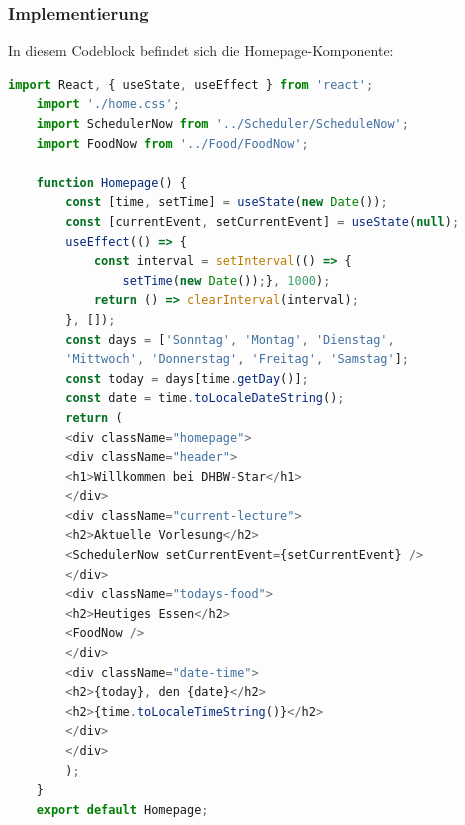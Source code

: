 \subsubsection{Implementierung}
In diesem Codeblock befindet sich die Homepage-Komponente:\\
\begin{lstlisting}[language=JavaScript,
	frame=single,           % Ein Rahmen um den Code
	framexleftmargin=15pt,  % Rahmen link von den Zahlen
	style=algoBericht,
	label={Homepage-Komponente},
	captionpos=b ,          % Caption unter den Code setzen
	caption={Homepage-Komponente}]
	import React, { useState, useEffect } from 'react';
	import './home.css';
	import SchedulerNow from '../Scheduler/ScheduleNow';
	import FoodNow from '../Food/FoodNow';
	
	function Homepage() {
		const [time, setTime] = useState(new Date());
		const [currentEvent, setCurrentEvent] = useState(null);
		useEffect(() => {
			const interval = setInterval(() => {
				setTime(new Date());}, 1000);
			return () => clearInterval(interval);
		}, []);
		const days = ['Sonntag', 'Montag', 'Dienstag', 
		'Mittwoch', 'Donnerstag', 'Freitag', 'Samstag'];
		const today = days[time.getDay()];
		const date = time.toLocaleDateString();
		return (
		<div className="homepage">
		<div className="header">
		<h1>Willkommen bei DHBW-Star</h1>
		</div>
		<div className="current-lecture">
		<h2>Aktuelle Vorlesung</h2>
		<SchedulerNow setCurrentEvent={setCurrentEvent} />
		</div>
		<div className="todays-food">
		<h2>Heutiges Essen</h2>
		<FoodNow />
		</div>
		<div className="date-time">
		<h2>{today}, den {date}</h2>
		<h2>{time.toLocaleTimeString()}</h2>
		</div>
		</div>
		);
	}
	export default Homepage;
	
\end{lstlisting}

